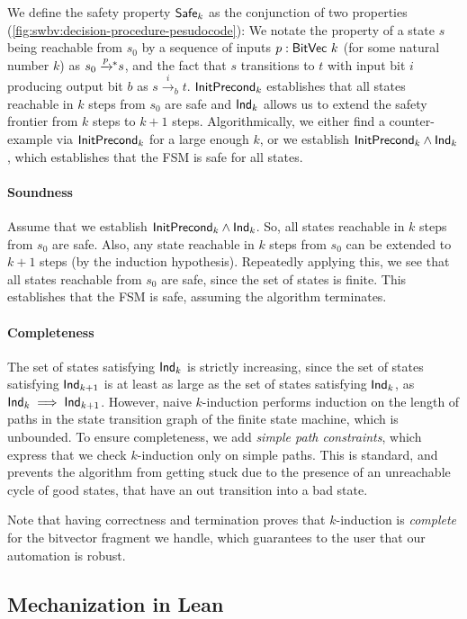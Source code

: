 We define the safety property $\mathsf{Safe}_k$ as the conjunction of two properties (\cref{fig:swbv:decision-procedure-pesudocode}):
We notate the property of a state $s$ being reachable from $s_0$ by a sequence of inputs $p : \mathsf{BitVec}~{k}$ (for some natural number $k$) as $s_0 \xrightarrow{\footnotesize p}\!\!^* s$,
and the fact that $s$ transitions to $t$ with input bit $i$ producing output bit $b$ as $s \xrightarrow{i}_b t$.
$\mathsf{InitPrecond}_k$ establishes that all states reachable in $k$ steps from $s_0$ are safe
and $\mathsf{Ind}_k$ allows us to extend the safety frontier from $k$ steps to $k+1$ steps.
Algorithmically, we either find a counter-example via $\mathsf{InitPrecond}_k$ for a
large enough $k$, or we establish $\mathsf{InitPrecond}_k \land \mathsf{Ind}_k$, which establishes that the FSM is safe for all states.

\paragraph{Soundness}
Assume that we establish $\mathsf{InitPrecond}_k \land \mathsf{Ind}_k$.
So, all states reachable in $k$ steps from $s_0$ are safe.
Also, any state reachable in $k$ steps from $s_0$ can be extended to $k+1$ steps (by the induction hypothesis).
Repeatedly applying this, we see that all states reachable from $s_0$ are safe, since the set of states is finite.
This establishes that the FSM is safe, assuming the algorithm terminates.

\paragraph{Completeness}
The set of states satisfying $\mathsf{Ind}_k$ is strictly increasing, since the set of states satisfying $\mathsf{Ind}_{k+1}$ is at least as large as the set of states satisfying $\mathsf{Ind}_{k}$,
as $\mathsf{Ind}_{k} \implies \mathsf{Ind}_{k+1}$.
However, naive $k$-induction performs induction on the length of paths in the state transition graph of the finite state machine, which is unbounded.
To ensure completeness, we add \emph{simple path constraints},
which express that we check $k$-induction only on simple paths.
This is standard, and prevents the algorithm from getting stuck due to the presence of an unreachable
cycle of good states, that have an out transition into a bad state.

Note that having correctness and termination proves that $k$-induction is \emph{complete} for the bitvector fragment we handle, which guarantees to the user that our automation is robust.

\subsection{Mechanization in Lean}

